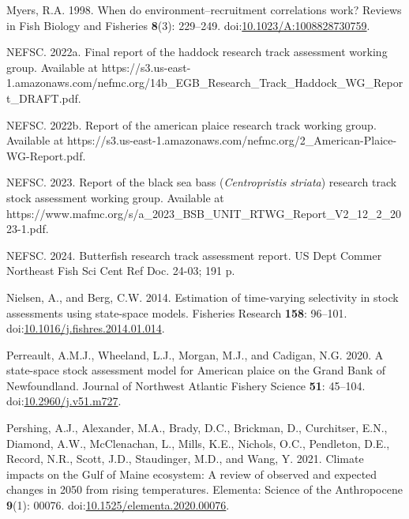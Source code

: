 \documentclass[
]{article}
\newlength{\cslhangindent}
\newlength{\cslentryspacingunit} %
\newenvironment{CSLReferences}[2] %
 {%
  \setlength{\parindent}{0pt}
  \ifodd #1
  \let\oldpar\par
  \def\par{\hangindent=\cslhangindent\oldpar}
  \fi
  \setlength{\parskip}{#2\cslentryspacingunit}
 }%
 {}
\begin{document}
\begin{CSLReferences}{1}{0}
\leavevmode{}%
Myers, R.A. 1998. When do environment--recruitment correlations work?
Reviews in Fish Biology and Fisheries \textbf{8}(3): 229--249.
doi:\href{https://doi.org/10.1023/A:1008828730759}{10.1023/A:1008828730759}.

\leavevmode{}%
NEFSC. 2022a. Final report of the haddock research track assessment
working group. {Available} at
https://s3.us-east-1.amazonaws.com/nefmc.org/14b\_EGB\_Research\_Track\_Haddock\_WG\_Report\_DRAFT.pdf.

\leavevmode{}%
NEFSC. 2022b. Report of the american plaice research track working
group. {Available} at
https://s3.us-east-1.amazonaws.com/nefmc.org/2\_American-Plaice-WG-Report.pdf.

\leavevmode{}%
NEFSC. 2023. Report of the black sea bass (\emph{{C}entropristis}
\emph{striata}) research track stock assessment working group.
{Available} at
https://www.mafmc.org/s/a\_2023\_BSB\_UNIT\_RTWG\_Report\_V2\_12\_2\_2023-1.pdf.

\leavevmode{}%
NEFSC. 2024. Butterfish research track assessment report. US Dept Commer
Northeast Fish Sci Cent Ref Doc. 24-03; 191 p.

\leavevmode{}%
Nielsen, A., and Berg, C.W. 2014. Estimation of time-varying selectivity
in stock assessments using state-space models. Fisheries Research
\textbf{158}: 96--101.
doi:\href{https://doi.org/10.1016/j.fishres.2014.01.014}{10.1016/j.fishres.2014.01.014}.

\leavevmode{}%
Perreault, A.M.J., Wheeland, L.J., Morgan, M.J., and Cadigan, N.G. 2020.
A state-space stock assessment model for {American} plaice on the
{Grand} {Bank} of {Newfoundland}. Journal of Northwest Atlantic Fishery
Science \textbf{51}: 45--104.
doi:\href{https://doi.org/10.2960/j.v51.m727}{10.2960/j.v51.m727}.

\leavevmode{}%
Pershing, A.J., Alexander, M.A., Brady, D.C., Brickman, D., Curchitser,
E.N., Diamond, A.W., McClenachan, L., Mills, K.E., Nichols, O.C.,
Pendleton, D.E., Record, N.R., Scott, J.D., Staudinger, M.D., and Wang,
Y. 2021. Climate impacts on the {G}ulf of {M}aine ecosystem: A review of
observed and expected changes in 2050 from rising temperatures.
Elementa: Science of the Anthropocene \textbf{9}(1): 00076.
doi:\href{https://doi.org/10.1525/elementa.2020.00076}{10.1525/elementa.2020.00076}.


\end{CSLReferences}
\end{document}
